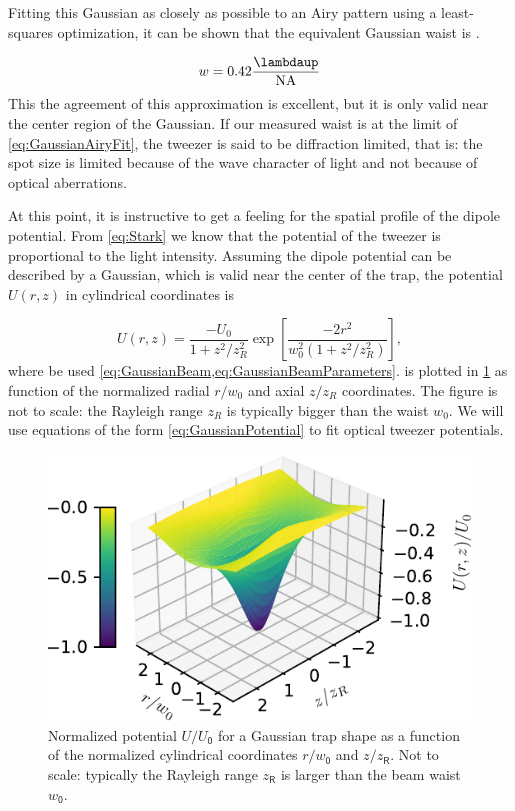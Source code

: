 Fitting this Gaussian as closely as possible to an Airy pattern using a least-squares optimization, it can be shown that the equivalent Gaussian waist is \cite{Zhang2007}.

\begin{equation}\label{eq:GaussianAiryFit}
    w = 0.42 \frac{\lambdaup}{\text{NA}}
\end{equation}
This the agreement of this approximation is excellent, but it is only valid near the center region of the Gaussian. 
If our measured waist is at the limit of \cref{eq:GaussianAiryFit}, the tweezer is said to be diffraction limited, that is: the spot size is limited because of the wave character of light and not because of optical aberrations. 

At this point, it is instructive to get a feeling for the spatial profile of the dipole potential.
From \cref{eq:Stark} we know that the potential of the tweezer is proportional to the light intensity. 
Assuming the dipole potential can be described by a Gaussian, which is valid \cite{Zhang2007} near the center of the trap, the potential $U(r,z)$ in cylindrical coordinates is

\begin{equation}\label{eq:GaussianPotential}
    U(r,z)=\frac{-U_{0}}{1+z^{2} / z_{R}^{2}} \exp \left[\frac{-2 r^{2}}{w_{0}^{2}\left(1+z^{2} / z_{R}^{2}\right)}\right],
\end{equation}
where be used \cref{eq:GaussianBeam,eq:GaussianBeamParameters}.
 is plotted in \cref{fig:GaussianPotential} as function of the normalized radial $r/w_0$ and axial $z/z_R$ coordinates. 
The figure is not to scale: the Rayleigh range $z_R$ is typically bigger than the waist $w_0$.
We will use equations of the form \cref{eq:GaussianPotential} to fit optical tweezer potentials.

\begin{figure}
    \centering
    \includegraphics[width=.56\linewidth]{figures/GaussianPotential.pdf}
    \caption{Normalized potential $\mathsf{\textit{U}/\textit{U}_0}$ for a Gaussian trap shape as a function of the normalized cylindrical coordinates $\mathsf{\textit{r}/\textit{w}_0}$ and $\mathsf{\textit{z}/\textit{z}_R}$. Not to scale: typically the Rayleigh range $\mathsf{\textit{z}_R}$ is larger than the beam waist $\mathsf{\textit{w}_0}$.}
    \label{fig:GaussianPotential}
\end{figure}



